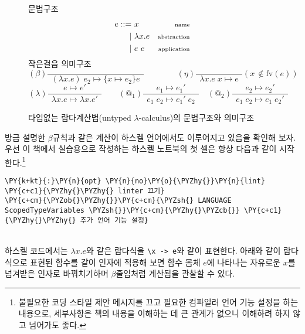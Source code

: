 \begin{figure}
문법구조\vspace*{-4.5ex}
    \begin{align*}
e ::=~& x           & {\scriptsize\textrm{name}} \\
 \mid~& \lambda x.e & {\scriptsize\textrm{abstraction}} \\
 \mid~& e~e         & {\scriptsize\textrm{application}}
\end{align*}
작은걸음 의미구조\vspace*{-1ex}
    \[
{\scriptstyle(\beta)}\frac{}{
~~(\lambda x.e)\;e_2 \longmapsto \{x{\mapsto}e_2\}e~~}
\qquad\qquad
{\scriptstyle(\eta)}\frac{}{
~~\lambda x.e\;x \longmapsto e~~}
({\scriptstyle x\,\notin\mathrm{fv}(e) })
\] \[
{\scriptstyle(\lambda)}\frac{e\longmapsto e'}{
~~\lambda x.e \longmapsto \lambda x.e'~~}
\qquad
{\scriptstyle(\textrm{@}_1)}\frac{e_1\longmapsto e_1'}{
~~e_1\;e_2 \longmapsto e_1'\;e_2~~}
\quad
{\scriptstyle(\textrm{@}_2)}\frac{e_2\longmapsto e_2'}{
~~e_1\;e_2 \longmapsto e_1\;e_2'~~}
\]
\caption{타입없는 람다계산법(untyped $\lambda$-calculus)의 문법구조와 의미구조
         \label{fig:UTLC} }
\end{figure}

    방금 설명한 \(\beta\)규칙과 같은 계산이 하스켈 언어에서도 이루어지고
있음을 확인해 보자. 우선 이 책에서 실습용으로 작성하는 하스켈 노트북의
첫 셀은 항상 다음과 같이 시작한다.\footnote{%
불필요한 코딩 스타일 제안 메시지를 끄고 필요한 컴파일러 언어 기능 설정을 하는 내용으로,
세부사항은 책의 내용을 이해하는 데 큰 관계가 없으니 이해하려 하지 않고 넘어가도 좋다.}

    \begin{tcolorbox}[breakable, size=fbox, boxrule=1pt, pad at break*=1mm,colback=cellbackground, colframe=cellborder]
\begin{Verbatim}[commandchars=\\\{\}]
\PY{k+kt}{:}\PY{n}{opt} \PY{n}{no}\PY{o}{\PYZhy{}}\PY{n}{lint}                          \PY{c+c1}{\PYZhy{}\PYZhy{} linter 끄기}
\PY{c+cm}{\PYZob{}\PYZhy{}}\PY{c+cm}{\PYZsh{} LANGUAGE ScopedTypeVariables \PYZsh{}}\PY{c+cm}{\PYZhy{}\PYZcb{}} \PY{c+c1}{\PYZhy{}\PYZhy{} 추가 언어 기능 설정}
\end{Verbatim}
\end{tcolorbox}
~\\[.25ex]\noindent
    하스켈 코드에서는 \(\lambda x.e\)와 같은 람다식을
\texttt{\textbackslash{}x\ -\textgreater{}\ e}와 같이 표현한다. 아래와
같이 람다식으로 표현된 함수를 같이 인자에 적용해 보면 함수 몸체 \(e\)에
나타나는 자유로운 \(x\)를 넘겨받은 인자로 바꿔치기하며 \(\beta\)줄임처럼
계산됨을 관찰할 수 있다.

